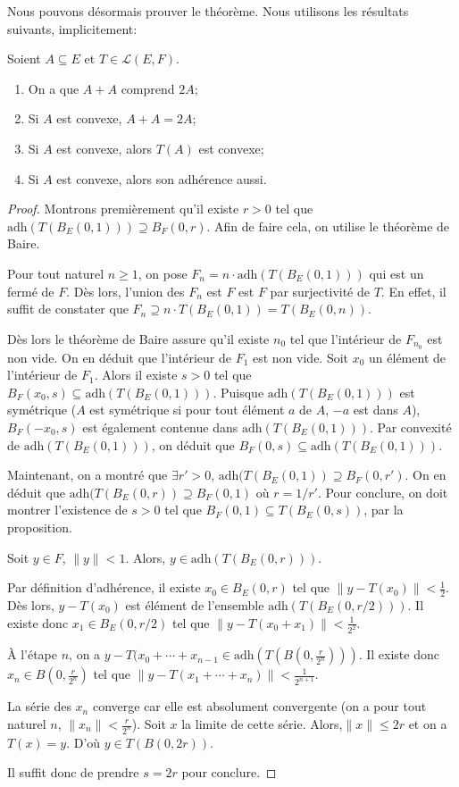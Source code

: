 Nous pouvons désormais prouver le théorème. Nous utilisons les résultats
suivants, implicitement:
\begin{exo}
  Soient $A\subseteq E$ et $T\in\mathscr{L}(E, F)$.
  \begin{enumerate}
  \item On a que $A + A$ comprend $2A$;
  \item Si $A$ est convexe, $A+A = 2A$;
  \item Si $A$ est convexe, alors $T(A)$ est convexe;
  \item Si $A$ est convexe, alors son adhérence aussi.
  \end{enumerate}
\end{exo}
\begin{proof}
  Montrons premièrement qu'il existe $r>0$ tel que $\mathrm{adh}(T(B_E(0, 1)))%
  \supseteq B_F(0, r)$. Afin de faire cela, on utilise le théorème de Baire.

  Pour tout naturel $n\geq 1$, on pose $F_n = n\cdot\mathrm{adh}(T(B_E(0, 1)))$
  qui est un fermé de $F$. Dès lors, l'union des $F_n$ est $F$ est $F$
  par surjectivité de $T$. En effet, il suffit de constater que
  $F_n\supseteq n\cdot T(B_E(0, 1)) =T(B_E(0, n))$.

  Dès lors le théorème de Baire assure qu'il existe $n_0$ tel que
  l'intérieur de $F_{n_0}$ est non vide. On en déduit que l'intérieur
  de $F_1$ est non vide. Soit $x_0$ un élément de l'intérieur de $F_1$.
  Alors il existe $s>0$ tel que
  $B_F(x_0, s)\subseteq  \mathrm{adh}(T(B_E(0, 1)))$. Puisque
  $\mathrm{adh}(T(B_E(0, 1)))$ est symétrique ($A$ est symétrique
  si pour tout élément $a$ de $A$, $-a$ est dans $A$), $B_F(-x_0, s)$
  est également contenue dans $\mathrm{adh}(T(B_E(0, 1)))$. Par convexité
  de $\mathrm{adh}(T(B_E(0, 1)))$, on déduit que
  $B_F(0, s)\subseteq \mathrm{adh}(T(B_E(0, 1)))$.

  Maintenant, on a montré que $\exists r' > 0$, $\mathrm{adh}(T(B_E(0, 1))%
  \supseteq B_F(0, r')$. On en déduit que $\mathrm{adh}(T(B_E(0, r))%
  \supseteq B_F(0, 1)$ où $r= 1/r'$. Pour conclure, on doit montrer l'existence
  de $s>0$ tel que $B_F(0, 1)\subseteq T(B_E(0, s))$, par la proposition.

  Soit $y\in F$, $\|y\| < 1$. Alors, $y\in\mathrm{adh}(T(B_E(0, r)))$.

  Par définition d'adhérence, il existe $x_0\in B_E(0, r)$ tel que
  $\|y-T(x_0)\| < \frac{1}{2}$. Dès lors, $y-T(x_0)$ est élément
  de l'ensemble $\mathrm{adh}(T(B_E(0, r/2)))$. Il existe donc
  $x_1\in B_E(0, r/2)$ tel que $\|y-T(x_0 + x_1)\| < \frac{1}{2^2}$.

  \`{A} l'étape $n$, on a $y - T(x_0 + \cdots + x_{n-1}\in%
  \mathrm{adh}(T(B(0, \frac{r}{2^n})))$. Il existe donc
  $x_n\in B(0, \frac{r}{2 ^{n}})$ tel que
  $\|y - T(x_1 + \cdots + x_n)\| < \frac{1}{2^{n+1}}$.

  La série des $x_n$ converge car elle est absolument convergente (on a
  pour tout naturel $n$, $\|x_n\|<\frac{r}{2^{n}}$). Soit $x$ la limite
  de cette série. Alors,$\|x\|\leq 2r$ et on a $T(x) = y$.
  D'où $y\in T(B(0, 2r))$.

  Il suffit donc de prendre $s = 2r$ pour conclure.
\end{proof}
